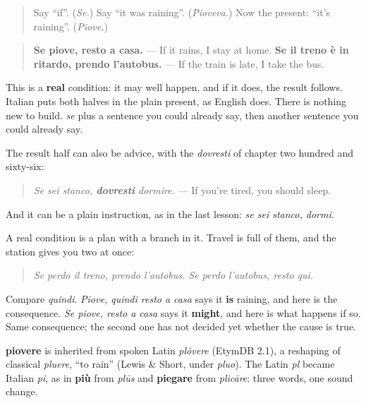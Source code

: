 \label{lesson:IT-C271-se-piove}



\begin{quote}
Say \textquotedblleft{}if\textquotedblright{}. (\emph{Se.}) Say \textquotedblleft{}it was raining\textquotedblright{}. (\emph{Pioveva.}) Now the present: \textquotedblleft{}it's raining\textquotedblright{}. (\emph{Piove.})
\end{quote}

\begin{grammarlens}[title={Grammar Lens: both halves in the present}]
\begin{quote}
\textbf{Se piove, resto a casa.} — If it rains, I stay at home. \textbf{Se il treno è in ritardo, prendo l'autobus.} — If the train is late, I take the bus.
\end{quote}

This is a \textbf{real} condition: it may well happen, and if it does, the result follows. Italian puts both halves in the plain present, as English does. There is nothing new to build. \emph{se} plus a sentence you could already say, then another sentence you could already say.

The result half can also be advice, with the \emph{dovresti} of chapter two hundred and sixty-six:

\begin{quote}
\emph{Se sei stanco, \textbf{dovresti} dormire.} — If you're tired, you should sleep.
\end{quote}

And it can be a plain instruction, as in the last lesson: \emph{se sei stanco, dormi}.
\end{grammarlens}

\begin{culture}
A real condition is a plan with a branch in it. Travel is full of them, and the station gives you two at once:

\begin{quote}
\emph{Se perdo il treno, prendo l'autobus. Se perdo l'autobus, resto qui.}
\end{quote}

Compare \emph{quindi}. \emph{Piove, quindi resto a casa} says it \textbf{is} raining, and here is the consequence. \emph{Se piove, resto a casa} says it \textbf{might}, and here is what happens if so. Same consequence; the second one has not decided yet whether the cause is true.
\end{culture}

\begin{cousinweb}
\textbf{piovere} is inherited from spoken Latin \emph{plŏvere} (EtymDB 2.1), a reshaping of classical \emph{pluere}, \textquotedblleft{}to rain\textquotedblright{} (Lewis \& Short, under \emph{pluo}). The Latin \emph{pl} became Italian \emph{pi}, as in \textbf{più} from \emph{plūs} and \textbf{piegare} from \emph{plicāre}: three words, one sound change.
\end{cousinweb}

